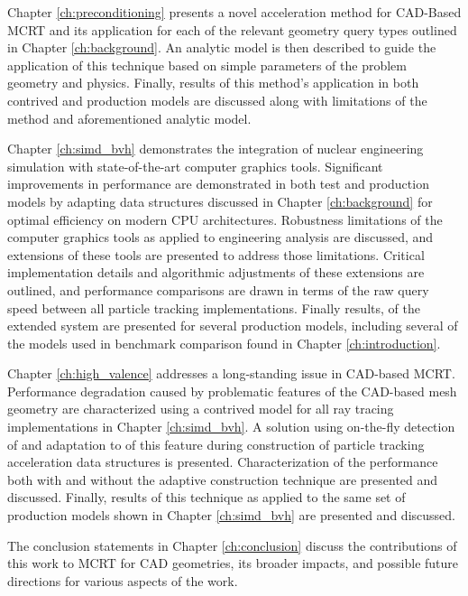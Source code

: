 Chapter \ref{ch:preconditioning} presents a novel acceleration method for
CAD-Based MCRT and its application for each of the relevant geometry query types
outlined in Chapter \ref{ch:background}. An analytic model is then described to
guide the application of this technique based on simple parameters of the problem geometry
and physics. Finally, results of this
method's application in both contrived and production models are discussed along
with limitations of the method and aforementioned analytic model.

Chapter \ref{ch:simd_bvh} demonstrates the integration of nuclear engineering
simulation with state-of-the-art computer graphics tools. Significant
improvements in performance are demonstrated in both test and production models
by adapting data structures discussed in Chapter \ref{ch:background} for optimal
efficiency on modern CPU architectures. Robustness limitations of the computer
graphics tools as applied to engineering analysis are discussed, and extensions
of these tools are presented to address those limitations. Critical
implementation details and algorithmic adjustments of these extensions are
outlined, and performance comparisons are drawn in terms of the raw query speed
between all particle tracking implementations. Finally results, of the extended
system are presented for several production models, including several of the
models used in benchmark comparison found in Chapter \ref{ch:introduction}.

Chapter \ref{ch:high_valence} addresses a long-standing issue in CAD-based
MCRT. Performance degradation caused by problematic features of the CAD-based
mesh geometry are characterized using a contrived model for all ray tracing
implementations in Chapter \ref{ch:simd_bvh}. A solution using on-the-fly
detection of and adaptation to of this feature during construction of particle
tracking acceleration data structures is presented. Characterization of the
performance both with and without the adaptive construction technique are
presented and discussed. Finally, results of this technique as applied to the
same set of production models shown in Chapter \ref{ch:simd_bvh} are presented
and discussed.

The conclusion statements in Chapter \ref{ch:conclusion} discuss the
contributions of this work to MCRT for CAD geometries, its broader impacts, and
possible future directions for various aspects of the work.
